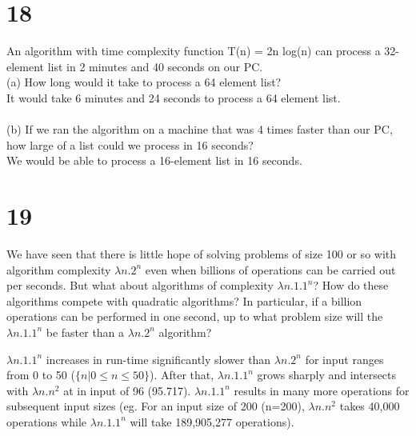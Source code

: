 \documentclass{article}
\begin{document}
        \begin{shaded} 
        \end{shaded} 


\section*{18}
    An algorithm with time complexity function T(n) = 2n log(n) can process a 32-element list in 2 minutes and 40 seconds on our PC.
    \\ (a) How long would it take to process a 64 element list?
    \\It would take 6 minutes and 24 seconds to process a 64 element list.
    \\
    \\ (b) If we ran the algorithm on a machine that was 4 times faster than our PC, how large of a list could we process in 16 seconds?
    \\We would be able to process a 16-element list in 16 seconds.
        \begin{shaded} 
        \end{shaded} 


\section*{19}
    We have seen that there is little hope of solving problems of size 100 or so with algorithm complexity $\lambda n. 2^{n}$ even when billions of operations can be carried out per seconds. But what about algorithms of complexity $\lambda n. 1.1^{n}$? How do these algorithms compete with quadratic algorithms? In particular, if a billion operations can be performed in one second, up to what problem size will the $\lambda n. 1.1^{n}$ be faster than a $\lambda n. 2^{n}$ algorithm?
        \begin{shaded} 
    $\lambda n. 1.1^{n}$ increases in run-time significantly slower than $\lambda n. 2^{n}$ for input ranges from 0 to 50 ($\{n | 0 \leq n \leq 50\}$). After that, $\lambda n. 1.1^{n}$ grows sharply and intersects with $\lambda n. n^{2}$ at in input of 96 (95.717). $\lambda n. 1.1^{n}$ results in many more operations for subsequent input sizes (eg. For an input size of 200 (n=200), $\lambda n. n^{2}$ takes 40,000 operations while $\lambda n. 1.1^{n}$ will take 189,905,277 operations).
        \end{shaded} 
\end{document}
